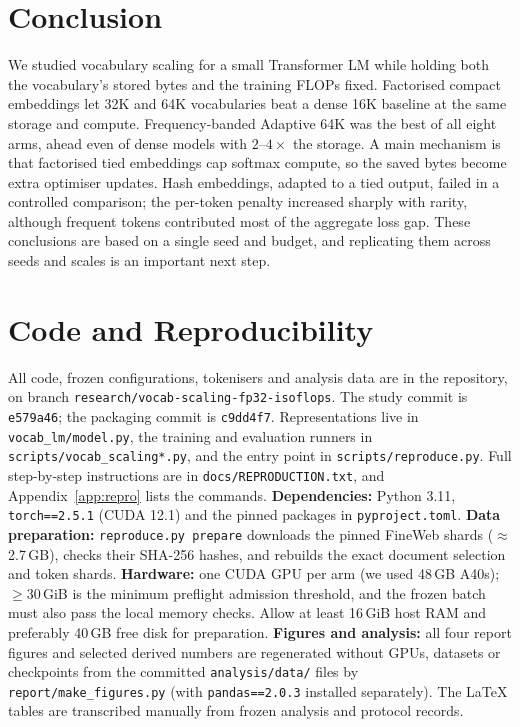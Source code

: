 \documentclass[10pt,a4paper]{article}
\begin{document}
\section{Conclusion}
We studied vocabulary scaling for a small Transformer LM while holding both the vocabulary's stored bytes
and the training FLOPs fixed. Factorised compact embeddings let 32K and 64K vocabularies beat a dense 16K
baseline at the same storage and compute. Frequency-banded Adaptive 64K was the best of all eight arms,
ahead even of dense models with $2$--$4\times$ the storage. A main mechanism is that factorised tied
embeddings cap softmax compute, so the saved bytes become extra optimiser updates. Hash embeddings, adapted to a tied output, 
failed in a controlled comparison; the per-token penalty increased sharply with rarity, although frequent tokens contributed 
most of the aggregate loss gap. These conclusions are based on a single seed and budget, and replicating them across seeds and scales is 
an important next step.

\section{Code and Reproducibility}
\label{sec:repro}
All code, frozen configurations, tokenisers and analysis data are in the repository, on branch
\texttt{research/vocab-scaling-fp32-isoflops}. The study commit is \texttt{e579a46}; the packaging commit
is \texttt{c9dd4f7}. \sloppy Representations live in \texttt{vocab\_lm/model.py}, the training and evaluation
runners in \texttt{scripts/vocab\_scaling*.py}, and the entry point in \texttt{scripts/reproduce.py}. Full
step-by-step instructions are in \texttt{docs/REPRODUCTION.txt}, and Appendix~\ref{app:repro} lists the
commands.
\textbf{Dependencies:} Python 3.11, \texttt{torch==2.5.1} (CUDA 12.1) and the pinned packages in
\texttt{pyproject.toml}. \textbf{Data preparation:}
\texttt{reproduce.py prepare} downloads the pinned FineWeb shards ($\approx$2.7\,GB), checks their SHA-256
hashes, and rebuilds the exact document selection and token shards.
\textbf{Hardware:} one CUDA GPU per arm (we used 48\,GB A40s); $\geq$30\,GiB is the minimum
preflight admission threshold, and the frozen batch must also pass the local memory checks.
Allow at least 16\,GiB host RAM and preferably 40\,GB free disk for preparation.
\textbf{Figures and analysis:} all four report figures and selected derived numbers are regenerated
without GPUs, datasets or checkpoints from the committed \texttt{analysis/data/} files by
\texttt{report/make\_figures.py} (with \texttt{pandas==2.0.3} installed separately).
The LaTeX tables are transcribed manually from frozen analysis and protocol records.
\end{document}
